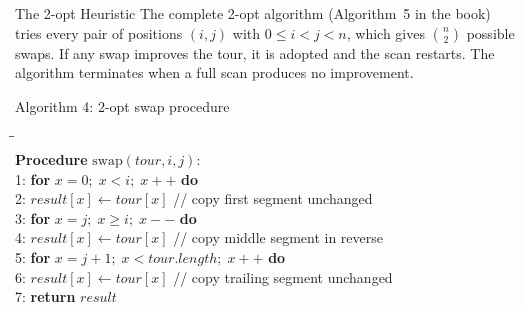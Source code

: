 \documentclass[aspectratio=169,10pt]{beamer}
\begin{document}
\begin{frame}[allowframebreaks]{The 2-opt Heuristic}
  The complete 2-opt algorithm (Algorithm~5 in the book) tries every
  pair of positions $(i, j)$ with $0 \leq i < j < n$, which gives
  $\binom{n}{2}$ possible swaps.  If any swap improves the tour, it is
  adopted and the scan restarts.  The algorithm terminates when a full
  scan produces no improvement.

\framebreak

  \begin{block}{Algorithm 4: 2-opt swap procedure}
    \begin{tabbing}
      \hspace{2em}\=\hspace{2em}\=\hspace{2em}\= \\
      \textbf{Procedure} $\mathrm{swap}(\mathit{tour}, i, j)$: \\
      1: \> \textbf{for} $x = 0;\; x < i;\; x{+}{+}$ \textbf{do} \\
      2: \>\> $\mathit{result}[x] \leftarrow \mathit{tour}[x]$
                \quad // copy first segment unchanged \\
      3: \> \textbf{for} $x = j;\; x \geq i;\; x{-}{-}$ \textbf{do} \\
      4: \>\> $\mathit{result}[x] \leftarrow \mathit{tour}[x]$
                \quad // copy middle segment in reverse \\
      5: \> \textbf{for} $x = j{+}1;\; x < \mathit{tour.length};\; x{+}{+}$ \textbf{do} \\
      6: \>\> $\mathit{result}[x] \leftarrow \mathit{tour}[x]$
                \quad // copy trailing segment unchanged \\
      7: \> \textbf{return} $\mathit{result}$
    \end{tabbing}
  \end{block}


\end{frame}
\end{document}

